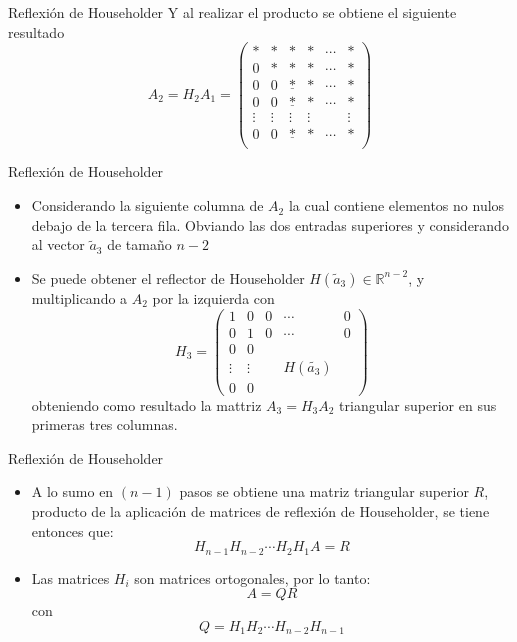 \documentclass{beamer}
\begin{document}
\begin{frame}{Reflexi\'on de Householder}
    Y al realizar el producto se obtiene el siguiente resultado    
    $$
    A_2 = H_2A_1 = \left(\begin{array}{cccccc}
                           *&*&*&*&\cdots&*\\
                           0&*&*&*&\cdots&*\\
                           0&0&\underline{*}&*&\cdots&*\\
                           0&0&\underline{*}&*&\cdots&*\\
                           \vdots&\vdots&\vdots&\vdots&& \vdots\\
                           0&0&\underline{*}&*&\cdots&*\\
                          \end{array}
    \right)
    $$
\end{frame}
\begin{frame}{Reflexi\'on de Householder}
  \begin{itemize}
    \item<1-> Considerando la siguiente columna de $A_2$ la cual contiene elementos no nulos debajo de la tercera
    fila. Obviando las dos entradas superiores y considerando al vector $\tilde a_3$ de
    tama\~no $n-2$ 
    \item<2-> Se puede obtener el reflector de Householder $H(\tilde a_3)\in
    \mathbb{R}^{n-2}$, y multiplicando a $A_2$ por la izquierda con
    $$
    H_3 = \left(\begin{array}{cc|ccc}
      1      & 0      & 0 & \cdots           & 0 \\
      0      & 1      & 0 & \cdots           & 0 \\\hline
      0      & 0      &   &                  & \\
      \vdots & \vdots &   &  H(\tilde {a_3}) &\\
      0      & 0      &   &                  &
     \end{array}
\right)
    $$
    obteniendo como resultado la mattriz $A_3 = H_3A_2$ triangular superior en sus primeras tres columnas.
  \end{itemize}
\end{frame}
\begin{frame}{Reflexi\'on de Householder}
  \begin{itemize}
    \item<1-> A lo sumo en $(n-1)$ pasos se obtiene una matriz triangular superior $R$, producto de la aplicaci\'on de
    matrices de reflexi\'on de Householder, se tiene entonces que:
    $$
    H_{n-1}H_{n-2}\cdots H_2H_1A=R
    $$
    \item<2-> Las matrices $H_i$ son matrices ortogonales, por lo tanto:    
    $$
    A=QR
    $$    
    con    
    $$
    Q=H_1H_2\cdots H_{n-2}H_{n-1}
    $$
    \end{itemize}
\end{frame}
\end{document}
